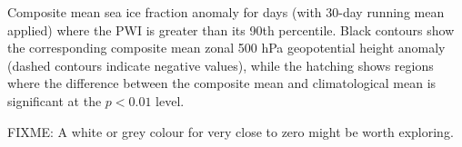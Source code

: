 \label{fig:sic_composite}
Composite mean sea ice fraction anomaly for days (with 30-day running mean applied) where the PWI is greater than its 90th percentile. Black contours show the corresponding composite mean zonal 500 hPa geopotential height anomaly (dashed contours indicate negative values), while the hatching shows regions where the difference between the composite mean and climatological mean is significant at the $p < 0.01$ level.

FIXME: A white or grey colour for very close to zero might be worth exploring.